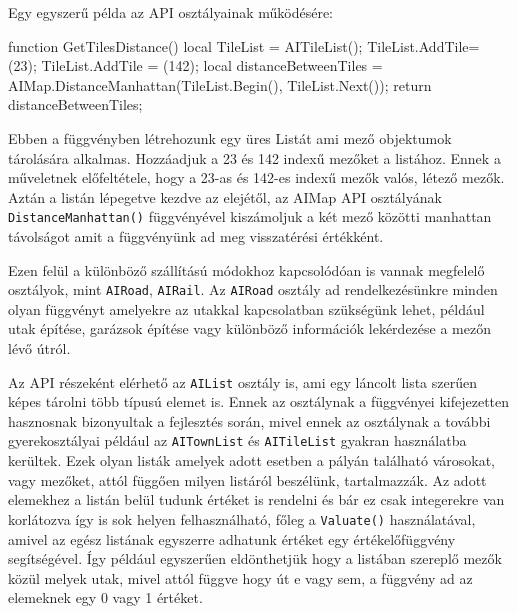 Egy egyszerű példa az API osztályainak működésére:

\begin{cpp}
function GetTilesDistance()
{
  local TileList = AITileList();
  TileList.AddTile= (23);
  TileList.AddTile = (142);
  local distanceBetweenTiles =
  AIMap.DistanceManhattan(TileList.Begin(), TileList.Next());
  return distanceBetweenTiles;
}
\end{cpp}

Ebben a függvényben létrehozunk egy üres Listát ami mező objektumok tárolására alkalmas. Hozzáadjuk a 23 és 142 indexű mezőket a listához. Ennek a műveletnek előfeltétele, hogy a 23-as és 142-es indexű mezők valós, létező mezők. Aztán a listán lépegetve kezdve az elejétől, az AIMap API osztályának \texttt{DistanceManhattan()} függvényével kiszámoljuk a két mező közötti manhattan távolságot amit a függvényünk ad meg visszatérési értékként.

Ezen felül a különböző szállítású módokhoz kapcsolódóan is vannak megfelelő osztályok, mint \texttt{AIRoad}, \texttt{AIRail}. Az \texttt{AIRoad} osztály ad rendelkezésünkre minden olyan függvényt amelyekre az utakkal kapcsolatban szükségünk lehet, például utak építése, garázsok építése vagy különböző információk lekérdezése a mezőn lévő útról.

Az API részeként elérhető az \texttt{AIList} osztály is, ami egy láncolt lista szerűen képes tárolni több típusú elemet is. Ennek az osztálynak a függvényei kifejezetten hasznosnak bizonyultak a fejlesztés során, mivel ennek az osztálynak a további gyerekosztályai például az \texttt{AITownList} és \texttt{AITileList} gyakran használatba kerültek. Ezek olyan listák amelyek adott esetben a pályán található városokat, vagy mezőket, attól függően milyen listáról beszélünk, tartalmazzák. Az adott elemekhez a listán belül tudunk értéket is rendelni és bár ez csak integerekre van korlátozva így is sok helyen felhasználható, főleg a \texttt{Valuate()} használatával, amivel az egész listának egyszerre adhatunk értéket egy értékelőfüggvény segítségével. Így például egyszerűen eldönthetjük hogy a listában szereplő mezők közül melyek utak, mivel attól függve hogy út e vagy sem, a függvény ad az elemeknek egy 0 vagy 1 értéket.


